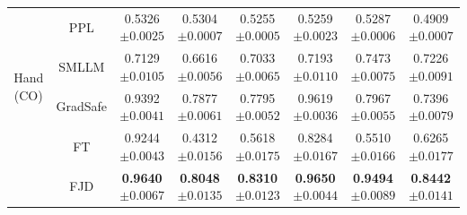 \documentclass{article}
\begin{document}
\begin{table}[t]
\begin{tabular}{cccccccc}
        \multirow{4}{*}{Hand (CO)} 
        & PPL & 0.5326\tiny{$\pm 0.0025$} & 0.5304\tiny{$\pm 0.0007$} & 0.5255\tiny{$\pm 0.0005$} & 0.5259\tiny{$\pm 0.0023$} & 0.5287\tiny{$\pm 0.0006$} & 0.4909\tiny{$\pm 0.0007$}\\
        & SMLLM & 0.7129\tiny{$\pm 0.0105$} & 0.6616\tiny{$\pm 0.0056$} & 0.7033\tiny{$\pm 0.0065$} & 0.7193\tiny{$\pm 0.0110$} & 0.7473\tiny{$\pm 0.0075$} & 0.7226\tiny{$\pm 0.0091$}\\
        & GradSafe & 0.9392\tiny{$\pm 0.0041$} & 0.7877\tiny{$\pm 0.0061$} & 0.7795\tiny{$\pm 0.0052$}  & 0.9619\tiny{$\pm 0.0036$} & 0.7967\tiny{$\pm 0.0055$} & 0.7396\tiny{$\pm 0.0079$} \\
        & FT & 0.9244\tiny{$\pm 0.0043$} & 0.4312\tiny{$\pm 0.0156$} & 0.5618\tiny{$\pm 0.0175$} & 0.8284\tiny{$\pm 0.0167$} & 0.5510\tiny{$\pm 0.0166$} & 0.6265\tiny{$\pm 0.0177$} \\
       \rowcolor{lightgray} & FJD & \textbf{0.9640}\tiny{$\pm 0.0067$} & \textbf{0.8048}\tiny{$\pm 0.0135$} & \textbf{0.8310}\tiny{$\pm 0.0123$} & \textbf{0.9650}\tiny{$\pm 0.0044$} & \textbf{0.9494}\tiny{$\pm 0.0089$} & \textbf{0.8442}\tiny{$\pm 0.0141$} \\

        \bottomrule

    \end{tabular}
    
    \label{auc}
\end{table}
\end{document}
